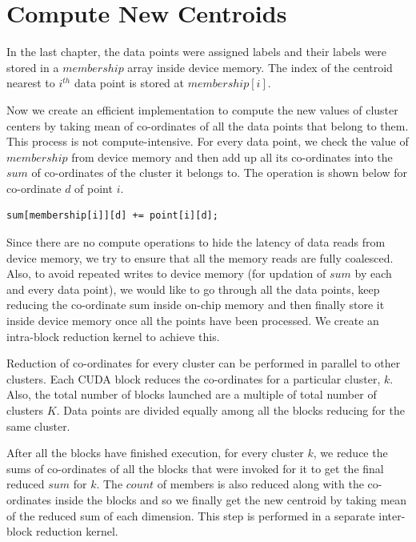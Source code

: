 \chapter{Compute New Centroids}
In the last chapter, the data points were assigned labels and their labels were stored in a $membership$ array inside device memory. The index of the centroid nearest to $i^{th}$ data point is stored at $membership[i]$.

Now we create an efficient implementation to compute the new values of cluster centers by taking mean of co-ordinates of all the data points that belong to them. This process is not compute-intensive. For every data point, we check the value of $membership$ from device memory and then add up all its co-ordinates into the $sum$ of co-ordinates of the cluster it belongs to. The operation is shown below for co-ordinate $d$ of point $i$.
\begin{lstlisting}
sum[membership[i]][d] += point[i][d];
\end{lstlisting}

Since there are no compute operations to hide the latency of data reads from device memory, we try to ensure that all the memory reads are fully coalesced. Also, to avoid repeated writes to device memory (for updation of $sum$ by each and every data point), we would like to go through all the data points, keep reducing the co-ordinate sum inside on-chip memory and then finally store it inside device memory once all the points have been processed. We create an intra-block reduction kernel to achieve this.

Reduction of co-ordinates for every cluster can be performed in parallel to other clusters. Each CUDA block reduces the co-ordinates for a particular cluster, $k$. Also, the total number of blocks launched are a multiple of total number of clusters $K$. Data points are divided equally among all the blocks reducing for the same cluster.

After all the blocks have finished execution, for every cluster $k$, we reduce the sums of co-ordinates of all the blocks that were invoked for it to get the final reduced $sum$ for $k$. The $count$ of members is also reduced along with the co-ordinates inside the blocks and so we finally get the new centroid by taking mean of the reduced sum of each dimension. This step is performed in a separate inter-block reduction kernel.

